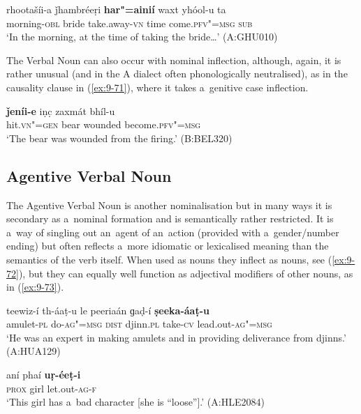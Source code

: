 \begin{exe}
\ex
\label{ex:9-70}
\gll rhootašíi-a ǰhambréeṛi \textbf{har"=ainií} waxt yhóol-u ta \\
morning-\textsc{obl} bride take.away-\textsc{vn} time come.\textsc{pfv"=msg} \textsc{sub} \\
\glt `In the morning, at the time of taking the bride{\ldots}' (A:GHU010)
\end{exe}

The Verbal Noun can also occur with nominal inflection, although, again, it is rather unusual (and in the A dialect often phonologically neutralised), as in the causality clause in (\ref{ex:9-71}), where it takes a~genitive case inflection. 

\begin{exe}
\ex
\label{ex:9-71}
\gll \textbf{ǰeníi-e} iṇc̣ zaxmát bhíl-u \\
hit.\textsc{vn"=gen} bear wounded become.\textsc{pfv"=msg} \\
\glt `The bear was wounded from the firing.' (B:BEL320)
\end{exe}

\subsection{Agentive Verbal Noun}
\label{subsec:9-3-4}


The Agentive Verbal Noun is another nominalisation but in many ways it is secondary as a~nominal formation and is semantically rather restricted. It is a~way of singling out an~agent of an~action (provided with a~gender/number ending) but often reflects a~more idiomatic or lexicalised meaning than the semantics of the verb itself. When used as nouns they inflect as nouns, see (\ref{ex:9-72}), but they can equally well function as adjectival modifiers of other nouns, as in (\ref{ex:9-73}).

\begin{exe}
\ex
\label{ex:9-72}
\gll teewiz-í th-áaṭ-u le peeriaán ɡaḍ-í \textbf{ṣeeka-áaṭ-u} \\
amulet-\textsc{pl} do-\textsc{ag"=msg} \textsc{dist} djinn.\textsc{pl} take-\textsc{cv} lead.out-\textsc{ag"=msg} \\
\glt `He was an expert in making amulets and in providing deliverance from djinns.' (A:HUA129)

\ex
\label{ex:9-73}
\gll aní phaí \textbf{uṛ-éeṭ-i} \\
\textsc{prox} girl let.out-\textsc{ag-f} \\
\glt `This girl has a~bad character [she is ``loose''].' (A:HLE2084)
\end{exe}

